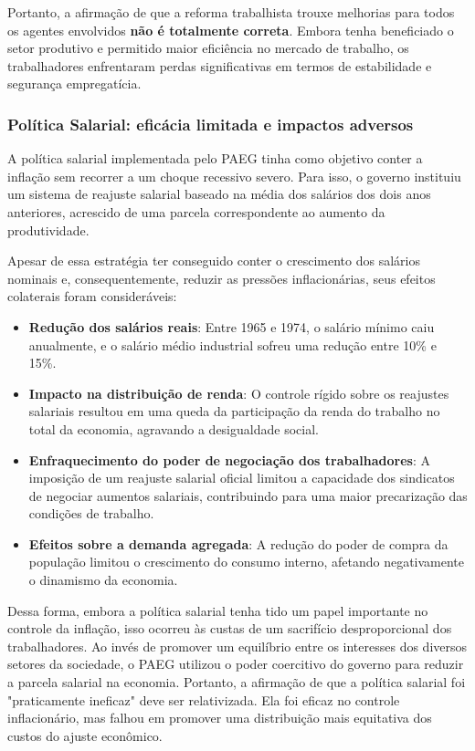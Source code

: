 \documentclass[a4paper,12pt]{article}[abntex2]
\begin{document}
Portanto, a afirmação de que a reforma trabalhista trouxe melhorias para todos os agentes envolvidos \textbf{não é totalmente correta}. Embora tenha beneficiado o setor produtivo e permitido maior eficiência no mercado de trabalho, os trabalhadores enfrentaram perdas significativas em termos de estabilidade e segurança empregatícia.

\subsubsection{Política Salarial: eficácia limitada e impactos adversos}
A política salarial implementada pelo PAEG tinha como objetivo conter a inflação sem recorrer a um choque recessivo severo. Para isso, o governo instituiu um sistema de reajuste salarial baseado na média dos salários dos dois anos anteriores, acrescido de uma parcela correspondente ao aumento da produtividade.

Apesar de essa estratégia ter conseguido conter o crescimento dos salários nominais e, consequentemente, reduzir as pressões inflacionárias, seus efeitos colaterais foram consideráveis:

\begin{itemize}
    \item \textbf{Redução dos salários reais}: Entre 1965 e 1974, o salário mínimo caiu anualmente, e o salário médio industrial sofreu uma redução entre 10\% e 15\%.
    \item \textbf{Impacto na distribuição de renda}: O controle rígido sobre os reajustes salariais resultou em uma queda da participação da renda do trabalho no total da economia, agravando a desigualdade social.
    \item \textbf{Enfraquecimento do poder de negociação dos trabalhadores}: A imposição de um reajuste salarial oficial limitou a capacidade dos sindicatos de negociar aumentos salariais, contribuindo para uma maior precarização das condições de trabalho.
    \item \textbf{Efeitos sobre a demanda agregada}: A redução do poder de compra da população limitou o crescimento do consumo interno, afetando negativamente o dinamismo da economia.
\end{itemize}

Dessa forma, embora a política salarial tenha tido um papel importante no controle da inflação, isso ocorreu às custas de um sacrifício desproporcional dos trabalhadores. Ao invés de promover um equilíbrio entre os interesses dos diversos setores da sociedade, o PAEG utilizou o poder coercitivo do governo para reduzir a parcela salarial na economia. Portanto, a afirmação de que a política salarial foi "praticamente ineficaz" deve ser relativizada. Ela foi eficaz no controle inflacionário, mas falhou em promover uma distribuição mais equitativa dos custos do ajuste econômico.
\end{document}
